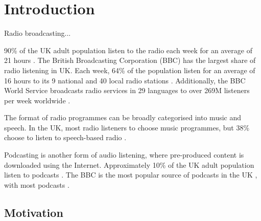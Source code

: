 \chapter{Introduction}\label{chp:intro}

Radio broadcasting...

90\% of the UK adult population listen to the radio each week for an average of 21 hours \citep{RAJAR2017a}. The
British Broadcasting Corporation (BBC) has the largest share of radio listening in UK. Each week, 64\% of the
population listen for an average of 16 hours to its 9 national and 40 local radio stations \citep{RAJAR2017a}.
Additionally, the BBC World Service broadcasts radio services in 29 languages to over 269M listeners per week worldwide
\citep{BBC2017}.

The format of radio programmes can be broadly categorised into music and speech.  In the UK, most radio listeners to
choose music programmes, but 38\% choose to listen to speech-based radio \citep[p.  97]{Ofcom2017}.

Podcasting is another form of audio listening, where pre-produced content is downloaded using the Internet.
Approximately 10\% of the UK adult population listen to podcasts \citep{RAJAR2017}. The BBC is the most popular
source of podcasts in the UK \citep[p. 107]{Ofcom2017}, with most podcasts .


\section{Motivation}\label{sec:intro-motivation}



